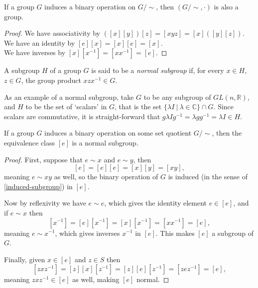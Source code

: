 \begin{prop}
	If a group $G$ induces a binary operation on $G/\sim$, then $(G/\sim, \cdot)$ is also a group.
\end{prop}
\begin{proof}
We have associativity by $([x][y])[z] = [xyz] = [x]([y][z])$.\\
We have an identity by $[e][x] = [x][e] = [x]$.\\
We have inverses by $[x][x^{-1}] = [xx^{-1}] = [e]$.
\end{proof}

\begin{define}
	A subgroup $H$ of a group $G$ is said to be a \emph{normal subgroup} if, for every $x \in H$, $z \in G$, the group product $xzx^{-1} \in G$.
\end{define}

As an example of a normal subgroup, take $G$ to be any subgroup of $GL(n, \mathbb{R})$, and $H$ to be the set of `scalars' in $G$, that is the set $\{\lambda I\ |\ \lambda \in \mathbb{C}\} \cap G$. Since scalars are commutative, it is straight-forward that $g\lambda I g^{-1} = \lambda gg^{-1} = \lambda I \in H$.

\begin{prop}
	If a group $G$ induces a binary operation on some set quotient $G/\sim$, then the equivalence class $[e]$ is a normal subgroup.
\end{prop}
\begin{proof}
	First, suppose that $e\sim x$ and $e\sim y$, then 
	\[[e] = [e][e] = [x][y] = [xy],\]
	meaning $e \sim xy$ as well, so the binary operation of $G$ is induced (in the sense of \autoref{induced-subgroup}) in $[e]$.
	
	Now by reflexivity we have $e \sim e$, which gives the identity element $e \in [e]$, and if $e \sim x$ then
	\[[x^{-1}] = [e][x^{-1}] = [x][x^{-1}] = [xx^{-1}] = [e],\]
	meaning $e \sim x^{-1}$, which gives inverses $x^{-1}$ in $[e]$. This makes $[e]$ a subgroup of $G$.
	
Finally, given $x \in [e]$ and $z \in S$ then
\[[zxz^{-1}] = [z][x][z^{-1}] = [z][e][z^{-1}] = [zez^{-1}] = [e],\]
meaning $zxz^{-1} \in [e]$ as well, making $[e]$ normal.
\end{proof}

